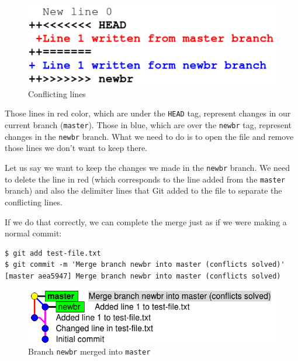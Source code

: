 \documentclass[a4paper,10pt]{article}
\newenvironment{terminal}
  {
    \vspace{+10pt}
    \begin{center}
    \begin{minipage}{0.95\textwidth}
    \begin{framed}
  }
  {
    \end{framed}
    \end{minipage}
    \end{center}
    \vspace{+10pt}
  }
\begin{document}
\begin{figure}[h]
  \begin{center}
    \includegraphics[scale=0.5]{git_example-08}
  \end{center}
  \caption{Conflicting lines}
\end{figure}

Those lines in red color, which are under the \texttt{HEAD} tag,
represent changes in our current branch (\texttt{master}). Those in
blue, which are over the \texttt{newbr} tag, represent changes in the
\texttt{newbr} branch. What we need to do is to open the file and
remove those lines we don't want to keep there.

Let us say we want to keep the changes we made in the \texttt{newbr}
branch. We need to delete the line in red (which corresponds to the
line added from the \texttt{master} branch) and also the delimiter
lines that Git added to the file to separate the conflicting lines.

If we do that correctly, we can complete the merge just as if we were
making a normal commit:

\begin{terminal}
\begin{verbatim}
$ git add test-file.txt
$ git commit -m 'Merge branch newbr into master (conflicts solved)'
[master aea5947] Merge branch newbr into master (conflicts solved)
\end{verbatim}
\end{terminal}

\begin{figure}[h]
  \begin{center}
    \includegraphics[scale=0.5]{git_example-09}
  \end{center}
  \caption{Branch \texttt{newbr} merged into \texttt{master}}
\end{figure}
\end{document}
